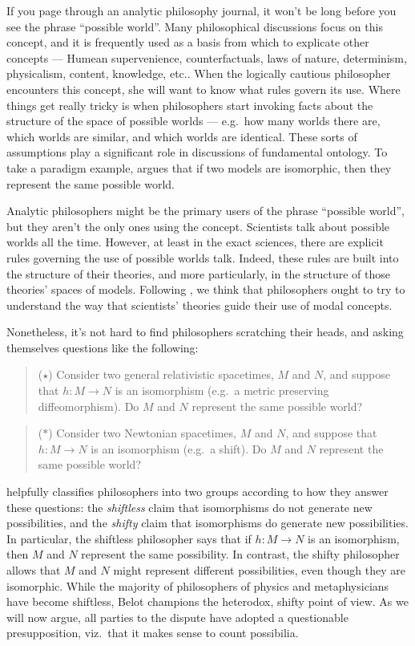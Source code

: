 
If you page through an analytic philosophy journal, it won't be long
before you see the phrase ``possible world''.  Many philosophical
discussions focus on this concept, and it is frequently used as a
basis from which to explicate other concepts --- Humean supervenience,
counterfactuals, laws of nature, determinism, physicalism, content,
knowledge, etc..  When the logically cautious philosopher encounters
this concept, she will want to know what rules govern its use.  Where
things get really tricky is when philosophers start invoking facts
about the structure of the space of possible worlds --- e.g.\ how
many worlds there are, which worlds are similar, and which worlds are
identical.  These sorts of assumptions play a significant role in
discussions of fundamental ontology.  To take a paradigm example,
\cite{baker2010} argues that if two models are isomorphic, then they
represent the same possible world.

Analytic philosophers might be the primary users of the phrase
``possible world'', but they aren't the only ones using the concept.
Scientists talk about possible worlds all the time.  However, at least
in the exact sciences, there are explicit rules governing the use of
possible worlds talk.  Indeed, these rules are built into the
structure of their theories, and more particularly, in the structure
of those theories' spaces of models.  Following \cite{elvis}, we think
that philosophers ought to try to understand the way that scientists'
theories guide their use of modal concepts.

Nonetheless, it's not hard to find philosophers scratching their
heads, and asking themselves questions like the following:
\begin{quote} ($\star$) Consider two general relativistic spacetimes,
  $M$ and $N$, and suppose that $h:M\to N$ is an isomorphism (e.g.\ a
  metric preserving diffeomorphism).  Do $M$ and $N$ represent the
  same possible world? \end{quote}
\begin{quote} ($\ast$) Consider two Newtonian spacetimes, $M$ and $N$,
  and suppose that $h:M\to N$ is an isomorphism (e.g.\ a shift).  Do
  $M$ and $N$ represent the same possible world?  \end{quote}
\cite{elvis} helpfully classifies philosophers into two groups
according to how they answer these questions: the {\it shiftless}
claim that isomorphisms do not generate new possibilities, and the
{\it shifty} claim that isomorphisms do generate new possibilities.
In particular, the shiftless philosopher says that if $h:M\to N$ is an
isomorphism, then $M$ and $N$ represent the same possibility.  In
contrast, the shifty philosopher allows that $M$ and $N$ might
represent different possibilities, even though they are isomorphic.
While the majority of philosophers of physics and metaphysicians have
become shiftless, Belot champions the heterodox, shifty point of view.
As we will now argue, all parties to the dispute have adopted a
questionable presupposition, viz.\ that it makes sense to count
possibilia.

